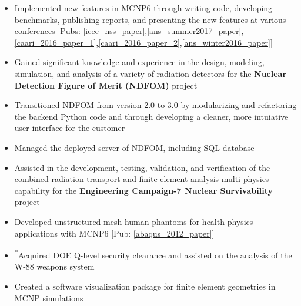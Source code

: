 \begin{minipage}{\textwidth}
    \begin{center}
	\begin{itemize}
	    \item Implemented new features in \textsc{MCNP6} through writing code, developing benchmarks, publishing reports, 
		    and presenting the new features at various conferences [Pubs: \ref{ieee_nss_paper},\ref{ans_summer2017_paper},\ref{caari_2016_paper_1},\ref{caari_2016_paper_2},\ref{ans_winter2016_paper}]\none 
		\item Gained significant knowledge and experience in the design, modeling, simulation, and analysis 
		    of a variety of radiation detectors for the \textbf{Nuclear Detection Figure of Merit (NDFOM)} project\ntwo
	    \item Transitioned NDFOM from version 2.0 to 3.0 by modularizing and refactoring the backend 
		   Python code and through developing a cleaner, more intuiative user interface for the customer\ntwo
	    \item Managed the deployed server of NDFOM, including SQL database\ntwo
	    \item Assisted in the development, testing, validation, and verification of the combined radiation transport and 
		    finite-element analysis multi-physics capability for the \textbf{Engineering Campaign-7 Nuclear Survivability} project\nthree
	    \item Developed unstructured mesh human phantoms for health physics applications with \textsc{MCNP6} [Pub: \ref{abaqus_2012_paper}]\nthree
	    \item \textsuperscript{*}Acquired DOE Q-level security clearance and assisted on the analysis of the W-88 weapons system\nthree
	    \item Created a software visualization package for finite element geometries in MCNP simulations\nfour

\end{itemize}
\end{center}
\end{minipage}
